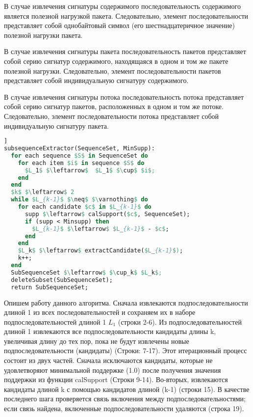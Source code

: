 В случае извлечения сигнатуры содержимого последовательность содержимого является полезной нагрузкой пакета.
Следовательно, элемент последовательности представляет собой однобайтовый символ (его шестнадцатеричное значение) полезной нагрузки пакета.

В случае извлечения сигнатуры пакета последовательность пакетов представляет собой серию сигнатур содержимого, находящаяся в одном и том же пакете полезной нагрузки.
Следовательно, элемент последовательности пакетов представляет собой индивидуальную сигнатуру содержимого.

В случае извлечения сигнатуры потока последовательность потока представляет собой серию сигнатур пакетов, расположенных в одном и том же потоке.
Следовательно, элемент последовательности потока представляет собой индивидуальную сигнатуру пакета.


\begin{lstlisting}[language=Pascal, caption=Алгоритм выделения подпоследовательности, mathescape]]
subsequenceExtractor(SequenceSet, MinSupp):
  for each sequence $S$ in SequenceSet do
    for each item $i$ in sequence $S$ do
      $L_1$ $\leftarrow$  $L_1$ $\cup$ $i$;
    end
  end
  $k$ $\leftarrow$ 2
  while $L_{k-1}$ $\neq$ $\varnothing$ do
    for each candidate $c$ in $L_{k-1}$ do
      supp $\leftarrow$ calSupport($c$, SequenceSet);
      if (supp < Minsupp) then
        $L_{k-1}$ $\leftarrow$ $L_{k-1}$ - $c$;
      end
    end
    $L_k$ $\leftarrow$ extractCandidate($L_{k-1}$);
    k++;
  end
  SubSequenceSet $\leftarrow$ $\cup_k$ $L_k$;
  deleteSubset(SubSequenceSet);
  return SubSequenceSet;
\end{lstlisting}

Опишем работу данного алгоритма.
Сначала извлекаются подпоследовательности длиной 1 из всех последовательностей и сохраняем их в наборе подпоследовательностей длиной 1 $L_1$ (строки 2-6).
Из подпоследовательностей длиной 1 извлекаются все подпоследовательности кандидаты длины k,
увеличивая длину до тех пор, пока не будут извлечены новые подпоследовательности (кандидаты) (Строки: 7-17).
Этот итерационный процесс состоит из двух частей.
Сначала исключаются кандидаты, которые не удовлетворяют минимальной поддержке (1.0) после получения значения поддержки из функции calSupport (Строки 9-14).
Во-вторых, извлекаются кандидаты длиной k с помощью кандидатов длиной (k-1) (строки 15).
В качестве последнего шага проверяется связь включения между подпоследовательностями; если связь найдена, включенные подпоследовательности удаляются (строка 19).

